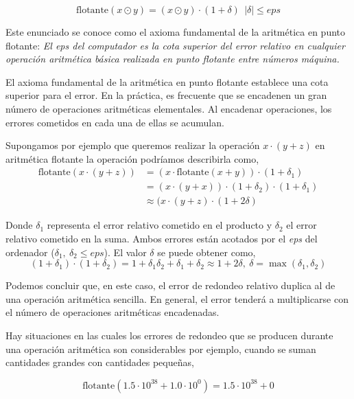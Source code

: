 \begin{equation*}
\text{flotante}(x\odot y)=(x\odot y)\cdot(1+\delta) \ \ \vert \delta \vert \leq eps
\end{equation*}

Este enunciado se conoce como el axioma fundamental de la aritmética en punto flotante:\emph{ El eps del computador es la cota superior del error relativo en cualquier operación aritmética básica realizada en punto flotante entre números máquina.} 

El axioma fundamental de la aritmética en punto flotante establece una cota superior para el error. En la práctica, es frecuente que se encadenen un gran número de operaciones aritméticas elementales. Al encadenar operaciones, los errores cometidos en cada una de ellas se acumulan.

Supongamos por ejemplo que queremos realizar la operación $x\cdot(y+z)$ en aritmética flotante la operación podríamos describirla como,
\begin{align*}
\text{flotante}\left(x\cdot (y+z)\right)& =\left(x\cdot\text{flotante}(x+y)\right)\cdot(1+\delta_1)\\
 & = (x\cdot(y+x))\cdot(1+\delta_2)\cdot(1+\delta_1)\\
 & \approx (x\cdot(y+z)\cdot(1+2\delta)
\end{align*}

Donde $\delta_1$ representa el error relativo cometido en el producto y $\delta_2$ el error relativo cometido en la suma. Ambos errores están acotados por el \emph{eps} del ordenador ($\delta_1, \ \delta_2 \leq eps$). El valor $\delta$ se puede obtener como,
\begin{equation*}
(1+\delta_1)\cdot(1+\delta_2)=1+\delta_1\delta_2+\delta_1+\delta_2\approx 1+2\delta,\ \delta=\max(\delta_1,\delta_2)
\end{equation*}

Podemos concluir que, en este caso, el error de redondeo relativo duplica al de una operación aritmética sencilla. En general, el error tenderá a multiplicarse con el número de operaciones aritméticas encadenadas.

Hay situaciones en las cuales los errores de redondeo que se producen durante una operación aritmética son considerables por ejemplo, cuando se suman cantidades grandes con cantidades pequeñas,

\begin{equation*}
\text{flotante}(1.5\cdot10^{38}+1.0\cdot10^0)=1.5\cdot10^{38} + 0
\end{equation*}

